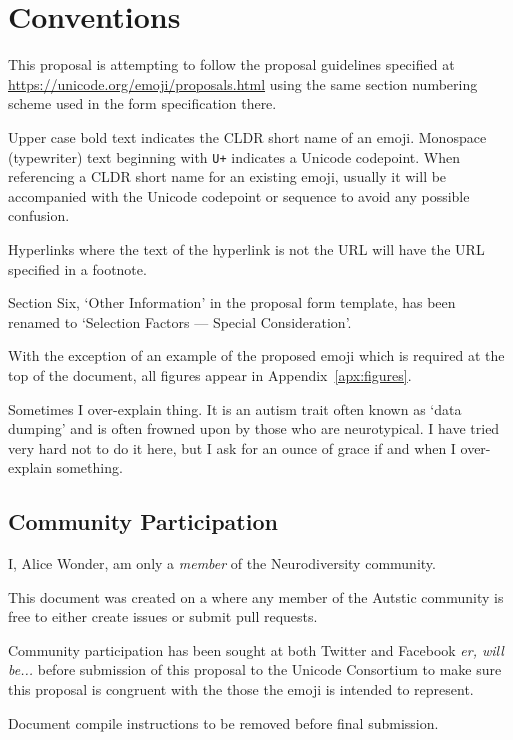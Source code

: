 \section*{Conventions}

This proposal is attempting to follow the proposal guidelines specified at
\url{https://unicode.org/emoji/proposals.html} using the same section numbering
scheme used in the form specification there.

Upper case bold text indicates the CLDR short name of an emoji. Monospace (typewriter)
text beginning with \texttt{U+} indicates a Unicode codepoint. When referencing a CLDR
short name for an existing emoji, usually it will be accompanied with the Unicode
codepoint or sequence to avoid any possible confusion.

Hyperlinks where the text of the hyperlink is not the URL will have the URL specified
in a footnote.

Section Six, `Other Information' in the proposal form template, has been renamed to
`Selection Factors --- Special Consideration'.

With the exception of an example of the proposed emoji which is required at the top of
the document, all figures appear in Appendix~\ref{apx:figures}.

Sometimes I over-explain thing. It is an autism trait often known as `data dumping' and
is often frowned upon by those who are neurotypical. I have tried very hard not to do
it here, but I ask for an ounce of grace if and when I over-explain something.

\subsection*{Community Participation}

I, Alice Wonder, am only a \emph{member} of the Neurodiversity community.

This document was created on a
where any member of the Autstic community is free to either create issues or submit pull
requests.

Community participation has been sought at both Twitter and Facebook \emph{er, will be...}
before submission of this proposal to the Unicode Consortium to make sure this proposal is
congruent with the those the emoji is intended to represent.

Document compile instructions to be removed before final submission.

